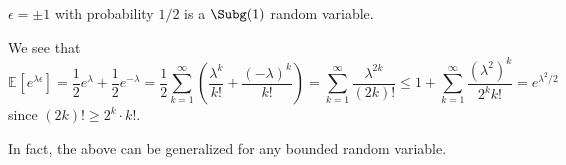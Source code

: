 \begin{eg}\label{eg:Rademacher-random-varaible}
  \(\epsilon = \pm 1\) with probability \(1 / 2\) is a \(\Subg(1) \) random variable.
\end{eg}
\begin{explanation}
  We see that
  \[
    \mathbb{E}_{}\left[e^{\lambda \epsilon } \right]
    = \frac{1}{2} e^\lambda + \frac{1}{2} e^{-\lambda }
    = \frac{1}{2} \sum_{k=1}^{\infty} \left( \frac{\lambda ^k}{k!} + \frac{(-\lambda )^k}{k!} \right)
    = \sum_{k=1}^{\infty} \frac{\lambda ^{2k}}{(2k)!}
    \leq 1 + \sum_{k=1}^{\infty} \frac{(\lambda ^2)^k}{2^k k!}
    = e^{\lambda ^2 / 2}
  \]
  since \((2k)! \geq 2^k \cdot k!\).
\end{explanation}

In fact, the above can be generalized for any bounded random variable.

